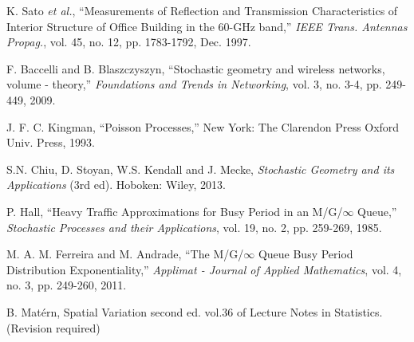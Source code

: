 \documentclass[10pt, conference, letterpaper]{IEEEtran}
\newcommand*{\Rom}[1]{\uppercase\expandafter{\romannumeral #1\relax}} %
\begin{document}
\begin{thebibliography}{50}

K. Sato \emph{et al.}, ``Measurements of Reflection and Transmission Characteristics of Interior Structure of Office Building in the 60-GHz band,'' \emph{IEEE Trans. Antennas Propag.}, vol. 45, no. 12, pp. 1783-1792, Dec. 1997.

F. Baccelli and B. Blaszczyszyn, ``Stochastic geometry and wireless networks, volume \Rom{1} - theory,'' \emph{Foundations and Trends in Networking}, vol. 3, no. 3-4, pp. 249-449, 2009.

J. F. C. Kingman, ``Poisson Processes,'' New York: The Clarendon Press Oxford Univ. Press, 1993.

S.N. Chiu, D. Stoyan, W.S. Kendall and J. Mecke, \emph{Stochastic Geometry and its Applications} (3rd ed). Hoboken: Wiley, 2013. 

P. Hall, ``Heavy Traffic Approximations for Busy Period in an M/G/$\infty$ Queue,'' \emph{Stochastic Processes and their Applications}, vol. 19, no. 2, pp. 259-269, 1985.

M. A. M. Ferreira and M. Andrade, ``The M/G/$\infty$ Queue Busy Period Distribution Exponentiality,'' \emph{Applimat - Journal of Applied Mathematics}, vol. 4, no. 3, pp. 249-260, 2011.


B. Mat\'ern, Spatial Variation second ed. vol.36 of Lecture Notes in Statistics. (Revision required)







\end{thebibliography}
\end{document}
